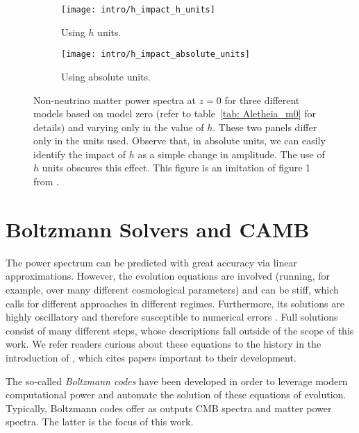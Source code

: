 \begin{figure}[htb]
    \begin{subfigure}{0.45 \textwidth}
    \centering
 		\texttt{[image: intro/h\_impact\_h\_units]}
 		\caption{Using $h$ units.}
 		\label{fig: h_units}
    \end{subfigure}
    \begin{subfigure}{0.45 \textwidth}
    \centering
 		\texttt{[image: intro/h\_impact\_absolute\_units]}
 		\caption{Using absolute units.}
 		\label{fig: without_h_units}
    \end{subfigure}
        \centering
    \caption[Impact of $h$ on $P(k)$]
    		{Non-neutrino matter power spectra at $z=0$ for three different
    		models based on model zero (refer to table~\ref{tab: Aletheia_m0} 
    		for details) and varying only in the value of $h$. These two
    		panels
    		differ only in the units used. Observe that, in absolute units, we
    		can easily identify the impact of $h$ as a simple change in
    		amplitude. The use of $h$ units obscures this effect. This figure 
    		is an imitation of figure 1 from \citet{San20}.}
    \label{fig: h_unit_Pk}
\end{figure}


\section{Boltzmann Solvers and CAMB}
\label{sec: boltzmann_intro}


The power spectrum can be predicted with great accuracy via linear 
approximations. However, the evolution equations are involved (running, for
example, over many different cosmological parameters) and can be
stiff, which calls for different approaches in different regimes. Furthermore,
its solutions are highly oscillatory and therefore susceptible to numerical
errors . Full solutions consist of many different steps, whose
descriptions fall outside of the scope of this work. We refer readers curious
about these equations to the history in the introduction of \citet{Seljak},
which cites papers important to their development. 


The so-called \textit{Boltzmann codes} have been 
developed in order to leverage modern computational power and automate the
solution of these equations of evolution. Typically, Boltzmann codes offer as
outputs CMB spectra and matter power spectra. The latter is the focus of this
work.

